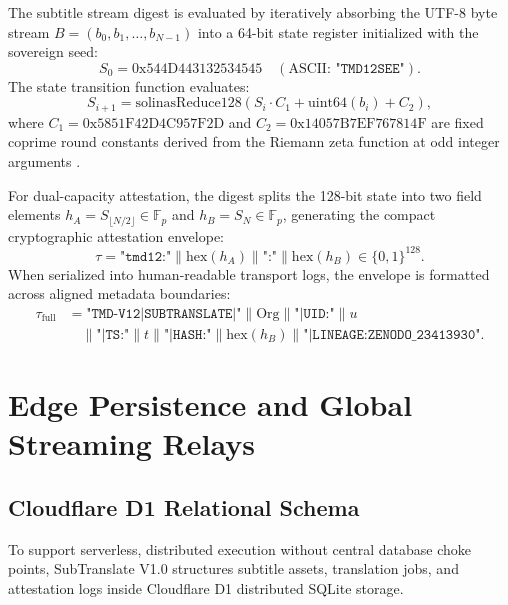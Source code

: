 \documentclass[11pt,a4paper,reqno]{article}
\theoremstyle{definition}
\theoremstyle{remark}
\begin{document}
The subtitle stream digest is evaluated by iteratively absorbing the UTF-8 byte stream $B = (b_0, b_1, \dots, b_{N-1})$ into a 64-bit state register initialized with the sovereign seed:
\begin{equation}
S_0 = 0\mathrm{x544D443132534545} \quad (\text{ASCII: } \texttt{"TMD12SEE"}).
\end{equation}
The state transition function evaluates:
\begin{equation}
S_{i+1} = \mathrm{solinasReduce128}\left( S_i \cdot C_1 + \mathrm{uint64}(b_i) + C_2 \right),
\end{equation}
where $C_1 = 0\mathrm{x5851F42D4C957F2D}$ and $C_2 = 0\mathrm{x14057B7EF767814F}$ are fixed coprime round constants derived from the Riemann zeta function at odd integer arguments \cite{tmd_hash_v12}. 

For dual-capacity attestation, the digest splits the 128-bit state into two field elements $h_A = S_{\lfloor N/2 \rfloor} \in \mathbb{F}_p$ and $h_B = S_N \in \mathbb{F}_p$, generating the compact cryptographic attestation envelope:
\begin{equation}
\label{eq:envelope_tau}
\tau = \texttt{"tmd12:"} \parallel \mathrm{hex}(h_A) \parallel \texttt{":"} \parallel \mathrm{hex}(h_B) \in \{0, 1\}^{128}.
\end{equation}
When serialized into human-readable transport logs, the envelope is formatted across aligned metadata boundaries:
\begin{equation}
\label{eq:envelope}
\begin{aligned}
\tau_{\mathrm{full}} &= \texttt{"TMD-V12|SUBTRANSLATE|"} \parallel \text{Org} \parallel \texttt{"|UID:"} \parallel u \\
&\quad \parallel \texttt{"|TS:"} \parallel t \parallel \texttt{"|HASH:"} \parallel \mathrm{hex}(h_B) \parallel \texttt{"|LINEAGE:ZENODO\_23413930"}.
\end{aligned}
\end{equation}

\section{Edge Persistence and Global Streaming Relays}
\label{sec:edge}

\subsection{Cloudflare D1 Relational Schema}
To support serverless, distributed execution without central database choke points, SubTranslate V1.0 structures subtitle assets, translation jobs, and attestation logs inside Cloudflare D1 distributed SQLite storage.
\end{document}
